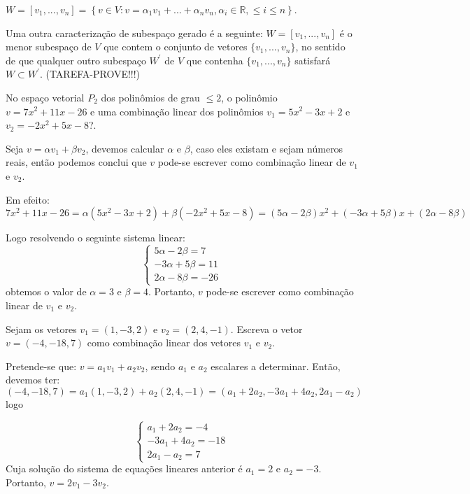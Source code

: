 $W=\left[ v_{1},...,v_{n}\right]=\left\lbrace v\in V:v=\alpha_{1}v_{1}+...+\alpha_{n}v_{n}, \alpha_{i}\in \mathbb{R}, \leqslant i\leqslant n  \right\rbrace $.

Uma outra caracterização de subespaço gerado é a seguinte: $W=\left[ v_{1},...,v_{n}\right]$ é o menor subespaço de $V$ que contem o conjunto de vetores $\{v_{1},...,v_{n}\}$, no sentido de que qualquer outro subespaço $W^{'}$ de $V$ que contenha $\{v_{1},...,v_{n}\}$ satisfará $W\subset W^{'}$. (TAREFA-PROVE!!!)
\begin{ex}
	No espaço vetorial $P_{2}$ dos polinômios de grau $\leqslant 2$, o polinômio $v=7x^{2}+11x-26$ e uma combinação linear dos polinômios $v_{1}=5x^{2}-3x+2$ e $v_{2}=-2x^{2}+5x-8$?.
\end{ex}
Seja $v=\alpha v_{1}+\beta v_{2}$, devemos calcular $\alpha$ e $\beta$, caso eles existam e sejam números reais, então podemos conclui que $v$ pode-se escrever como combinação linear de $v_{1}$ e $v_{2}$.

Em efeito:\\
$7x^{2}+11x-26=\alpha (5x^{2}-3x+2)+\beta(-2x^{2}+5x-8)=(5\alpha-2\beta)x^{2}+(-3\alpha+5\beta)x+(2\alpha-8\beta)$

Logo resolvendo o seguinte sistema linear: 
\begin{equation*}
\begin{cases}
5\alpha-2\beta=7   \\
-3\alpha+5\beta=11 \\
2\alpha-8\beta=-26 
\end{cases}
\end{equation*} 
obtemos o valor de $\alpha=3$ e $\beta=4$. Portanto, $v$ pode-se escrever como combinação linear de $v_{1}$ e $v_{2}$. 
\begin{ex}
	Sejam os vetores $v_{1}=(1,-3,2)$ e $v_{2}=(2,4,-1)$. Escreva o vetor $v=(-4,-18,7)$ como combinação linear dos vetores $v_{1}$ e $v_{2}$.
\end{ex}
Pretende-se que: $v=a_{1} v_{1}+a_{2} v_{2}$, sendo $a_{1}$ e $a_{2}$ escalares a determinar. Então, devemos ter: $(-4,-18,7)=a_{1}(1,-3,2)+a_{2}(2,4,-1)=(a_{1}+2a_{2},-3a_{1}+4a_{2},2a_{1}-a_{2})$ logo 

\begin{equation*}
\begin{cases}
a_{1}+2a_{2}=-4   \\
-3a_{1}+4a_{2}=-18 \\
2a_{1}-a_{2}=7 
\end{cases}
\end{equation*}
Cuja solução do sistema de equações lineares anterior é $a_{1}=2$ e $a_{2}=-3$. Portanto, $v=2v_{1}-3v_{2}$.

